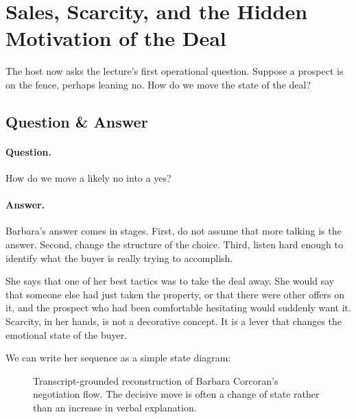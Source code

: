 \section{Sales, Scarcity, and the Hidden Motivation of the Deal}

The host now asks the lecture's first operational question. Suppose a prospect is on the fence, perhaps leaning no. How do we move the state of the deal?

\subsection{Question \& Answer}

\paragraph{Question.} How do we move a likely no into a yes?

\paragraph{Answer.} Barbara's answer comes in stages. First, do not assume that more talking is the answer. Second, change the structure of the choice. Third, listen hard enough to identify what the buyer is really trying to accomplish.

She says that one of her best tactics was to take the deal away. She would say that someone else had just taken the property, or that there were other offers on it, and the prospect who had been comfortable hesitating would suddenly want it. Scarcity, in her hands, is not a decorative concept. It is a lever that changes the emotional state of the buyer.

We can write her sequence as a simple state diagram:
\begin{figure}[h]
\centering
{}
\caption{Transcript-grounded reconstruction of Barbara Corcoran's negotiation flow. The decisive move is often a change of state rather than an increase in verbal explanation.}
\end{figure}

